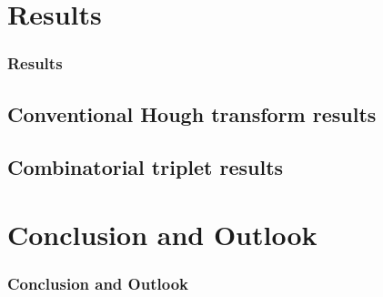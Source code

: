 \documentclass[10pt, xcolor={table}]{beamer}
\begin{document}


\section{Results} %
\label{sec:results}

\begin{frame}[c]\frametitle{Results}
    


\end{frame}

\subsection{Conventional Hough transform results} %
\label{sub:conventional_hough_transform_results}


\subsection{Combinatorial triplet results} %
\label{sub:combinatorial_triplet_results}


\section{Conclusion and Outlook} %
\label{sec:conclusion_and_outlook}

\begin{frame}[c]\frametitle{Conclusion and Outlook}
    


\end{frame}

\end{document}
